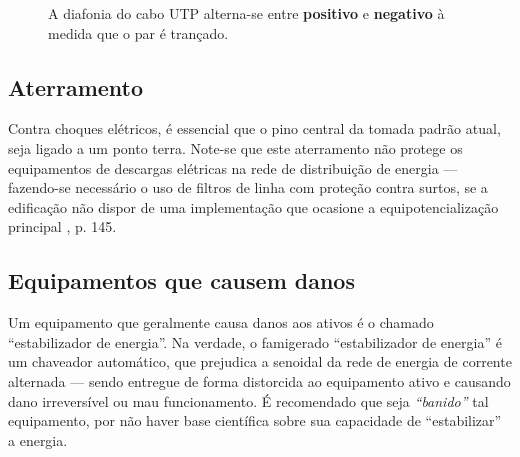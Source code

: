 \documentclass[	DIV=calc,%
							paper=a4,%
							fontsize=12pt,%
							onecolumn]{scrartcl}	 					%
\begin{document}
\begin{figure}[H]
	\noindent{}
	\caption{A diafonia do cabo UTP alterna-se entre \textbf{positivo} e \textbf{negativo} à medida que o par é trançado. \cite{cancel}}
	\label{fig6}
\end{figure}



\subsection{Aterramento}

Contra choques elétricos, é essencial que o pino central da tomada padrão atual, seja ligado a um ponto terra. Note-se que este aterramento não protege os equipamentos de descargas elétricas na rede de distribuição de energia --- fazendo-se necessário o uso de filtros de linha com proteção contra surtos, se a edificação não dispor de uma implementação que ocasione a equipotencialização principal \cite{abnt5410}, p. 145.

\subsection{Equipamentos que causem danos}

Um equipamento que geralmente causa danos aos ativos é o chamado ``estabilizador de energia''. Na verdade, o famigerado ``estabilizador de energia'' é um chaveador automático, que prejudica a senoidal da rede de energia de corrente alternada --- sendo entregue de forma distorcida ao equipamento ativo e causando dano irreversível ou mau funcionamento. É recomendado que seja \textit{``banido''} tal equipamento, por não haver base científica sobre sua capacidade de ``estabilizar'' a energia.
\end{document}
